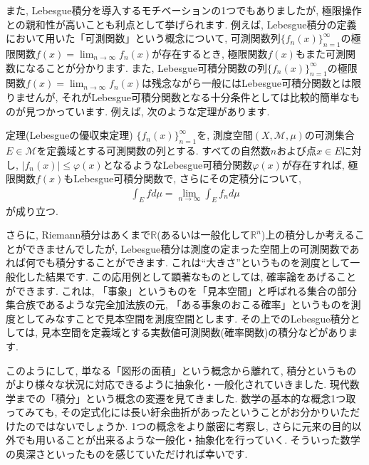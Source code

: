 \par また, Lebesgue積分を導入するモチベーションの1つでもありましたが, 極限操作との親和性が高いことも利点として挙げられます. 例えば, Lebesgue積分の定義において用いた「可測関数」という概念について, 可測関数列$\{f_n(x)\}_{n=1}^{\infty}$の極限関数$f(x)=\displaystyle\lim _{n \to \infty}f_{n}(x)$が存在するとき, 極限関数$f(x)$もまた可測関数になることが分かります. また, Lebesgue可積分関数の列$\{f_n(x)\}_{n=1}^{\infty}$の極限関数$f(x)=\displaystyle\lim _{n \to \infty}f_{n}(x)$は残念ながら一般にはLebesgue可積分関数とは限りませんが, それがLebesgue可積分関数となる十分条件としては比較的簡単なものが見つかっています. 例えば, 次のような定理があります. 
\begin{itembox}[l]{定理(Lebesgueの優収束定理)}
$\{f_n(x)\}_{n=1}^{\infty}$を, 測度空間$(X,\mathcal{M},\mu)$の可測集合$E\in \mathcal{M}$を定義域とする可測関数の列とする. すべての自然数$n$および点$x\in E$に対し, $\left| f_{n}(x)\right| \le \varphi(x)$となるようなLebesgue可積分関数$\varphi(x)$が存在すれば, 極限関数$f(x)$もLebesgue可積分関数で, さらにその定積分について, 
\begin{eqnarray}
\int_{E}fd\mu=\lim_{n \to \infty} \int_{E}f_{n}d\mu \nonumber
\end{eqnarray}
が成り立つ. 
\end{itembox}
\par さらに, Riemann積分はあくまで$\mathbb{R}$(あるいは一般化して$\mathbb{R}^n$)上の積分しか考えることができませんでしたが, Lebesgue積分は測度の定まった空間上の可測関数であれば何でも積分することができます. これは“大きさ”というものを測度として一般化した結果です. この応用例として顕著なものとしては, 確率論をあげることができます. これは, 「事象」というものを「見本空間」と呼ばれる集合の部分集合族であるような完全加法族の元, 「ある事象のおこる確率」というものを測度としてみなすことで見本空間を測度空間とします. その上でのLebesgue積分としては, 見本空間を定義域とする実数値可測関数(確率関数)の積分などがあります. 
\par このようにして, 単なる「図形の面積」という概念から離れて, 積分というものがより様々な状況に対応できるように抽象化・一般化されていきました. 
現代数学までの「積分」という概念の変遷を見てきました. 数学の基本的な概念1つ取ってみても, その定式化には長い紆余曲折があったということがお分かりいただけたのではないでしょうか. 1つの概念をより厳密に考察し, さらに元来の目的以外でも用いることが出来るような一般化・抽象化を行っていく. そういった数学の奥深さといったものを感じていただければ幸いです. 

